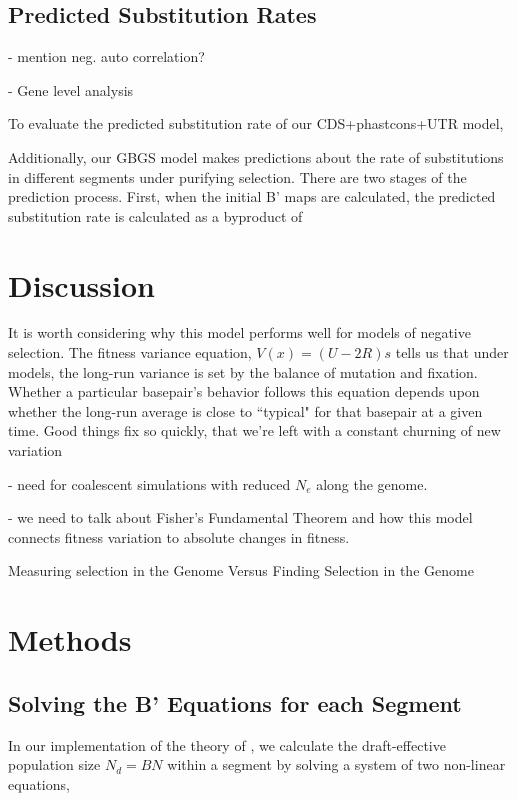 \documentclass[11pt]{article}
\begin{document}
\subsection*{Predicted Substitution Rates}

- mention neg. auto correlation?

- Gene level analysis

To evaluate the predicted substitution rate of our CDS+phastcons+UTR model, 


Additionally, our GBGS model makes predictions about the rate of substitutions
in different segments under purifying selection. There are two stages of the
prediction process. First, when the initial B' maps are calculated, the
predicted substitution rate is calculated as a byproduct of 

\section*{Discussion}

It is worth considering why this model performs well for models of negative
selection. The fitness variance equation, $V(x) = (U-2R)s$ tells us that under
models, the long-run variance is set by the balance of mutation and fixation.
Whether a particular basepair's behavior follows this equation depends upon
whether the long-run average is close to ``typical" for that basepair at a
given time. Good things fix so quickly, that we're left with a constant
churning of new variation

- need for coalescent simulations with reduced $N_e$ along the genome.

- we need to talk about Fisher's Fundamental Theorem and how this model
connects fitness variation to absolute changes in fitness.

Measuring selection in the Genome Versus Finding Selection in the Genome


\section*{Methods}

\subsection*{Solving the B' Equations for each Segment}
\label{sec:methods-bprime-eqns}

In our implementation of the theory of \textcite{Santiago2016-mu}, we calculate
the draft-effective population size $N_d = B N$ within a segment by solving a
system of two non-linear equations, 
\end{document}
